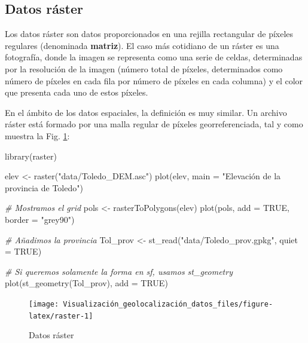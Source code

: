 \documentclass[
]{book}
\newenvironment{Shaded}{\begin{snugshade}}{\end{snugshade}}
\newcommand{\AttributeTok}[1]{\textcolor[rgb]{0.77,0.63,0.00}{#1}}
\newcommand{\CommentTok}[1]{\textcolor[rgb]{0.56,0.35,0.01}{\textit{#1}}}
\newcommand{\ConstantTok}[1]{\textcolor[rgb]{0.00,0.00,0.00}{#1}}
\newcommand{\FunctionTok}[1]{\textcolor[rgb]{0.00,0.00,0.00}{#1}}
\newcommand{\NormalTok}[1]{#1}
\newcommand{\OtherTok}[1]{\textcolor[rgb]{0.56,0.35,0.01}{#1}}
\newcommand{\StringTok}[1]{\textcolor[rgb]{0.31,0.60,0.02}{#1}}
\theoremstyle{definition}
\theoremstyle{definition}
\theoremstyle{definition}
\theoremstyle{definition}
\theoremstyle{remark}
\begin{document}
\hypertarget{raster}{%
\subsection{Datos ráster}\label{raster}}

Los datos ráster son datos proporcionados en una rejilla rectangular de píxeles
regulares (denominada \textbf{matriz}). El caso más cotidiano de un ráster es una
fotografía, donde la imagen se representa como una serie de celdas, determinadas
por la resolución de la imagen (número total de píxeles, determinados como
número de píxeles en cada fila por número de píxeles en cada columna) y el color
que presenta cada uno de estos píxeles.

En el ámbito de los datos espaciales, la definición es muy similar. Un archivo
ráster está formado por una malla regular de píxeles georreferenciada, tal y
como muestra la Fig. \ref{fig:raster}:

\begin{Shaded}
\begin{Highlighting}[]

\FunctionTok{library}\NormalTok{(raster)}

\NormalTok{elev }\OtherTok{\textless{}{-}} \FunctionTok{raster}\NormalTok{(}\StringTok{"data/Toledo\_DEM.asc"}\NormalTok{)}
\FunctionTok{plot}\NormalTok{(elev, }\AttributeTok{main =} \StringTok{"Elevación de la provincia de Toledo"}\NormalTok{)}

\CommentTok{\# Mostramos el grid}
\NormalTok{pols }\OtherTok{\textless{}{-}} \FunctionTok{rasterToPolygons}\NormalTok{(elev)}
\FunctionTok{plot}\NormalTok{(pols, }\AttributeTok{add =} \ConstantTok{TRUE}\NormalTok{, }\AttributeTok{border =} \StringTok{"grey90"}\NormalTok{)}

\CommentTok{\# Añadimos la provincia}
\NormalTok{Tol\_prov }\OtherTok{\textless{}{-}} \FunctionTok{st\_read}\NormalTok{(}\StringTok{"data/Toledo\_prov.gpkg"}\NormalTok{, }\AttributeTok{quiet =} \ConstantTok{TRUE}\NormalTok{)}

\CommentTok{\# Si queremos solamente la forma en sf, usamos st\_geometry}
\FunctionTok{plot}\NormalTok{(}\FunctionTok{st\_geometry}\NormalTok{(Tol\_prov), }\AttributeTok{add =} \ConstantTok{TRUE}\NormalTok{)}
\end{Highlighting}
\end{Shaded}

\begin{figure}

{\centering \texttt{[image: Visualización\_geolocalización\_datos\_files/figure-latex/raster-1]} 

}

\caption{Datos ráster}\label{fig:raster}
\end{figure}
\end{document}
